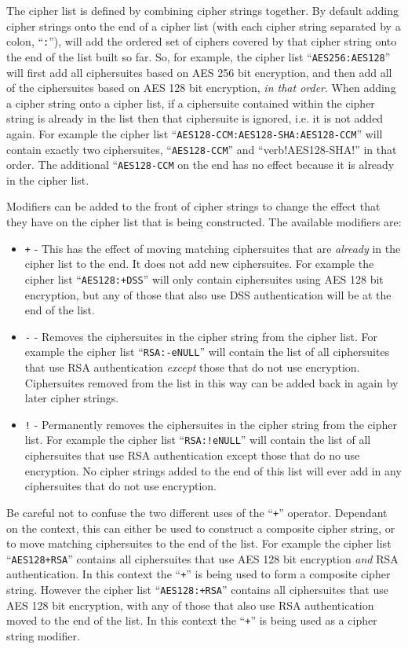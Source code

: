 The cipher list is defined by combining cipher strings together. By default 
adding cipher strings onto the end of a cipher list (with each cipher string 
separated by a colon, ``\verb!:!''), will add the ordered set of ciphers 
covered by that cipher string onto the end of the list built so far. So, for 
example, the cipher list ``\verb!AES256:AES128!'' will first add all 
ciphersuites based on AES 256 bit encryption, and then add all of the 
ciphersuites based on AES 128 bit encryption, \emph{in that order}. When adding 
a cipher string onto a cipher list, if a ciphersuite contained within the 
cipher string is already in the list then that ciphersuite is ignored, i.e. it 
is not added again. For example the cipher list 
``\verb!AES128-CCM:AES128-SHA:AES128-CCM!'' will contain exactly two
ciphersuites, ``\verb!AES128-CCM!'' and ``verb!AES128-SHA!'' in that order. The
additional ``\verb!AES128-CCM! on the end has no effect because it is already in
the cipher list.

Modifiers can be added to the front of cipher strings to change the effect that 
they have on the cipher list that is being constructed. The available modifiers 
are:
\begin{itemize}
\item \texttt{+} - This has the effect of moving matching ciphersuites that are 
\emph{already} in the cipher list to the end. It does not add new ciphersuites. 
For example the cipher list ``\texttt{AES128:+DSS}'' will only contain
ciphersuites using AES 128 bit encryption, but any of those that also use DSS
authentication will be at the end of the list.
\item \texttt{-} - Removes the ciphersuites in the cipher string from the 
cipher list. For example the cipher list ``\texttt{RSA:-eNULL}'' will contain 
the list of all ciphersuites that use RSA authentication \emph{except} those
that do not use encryption. Ciphersuites removed from the list in this way can 
be added back in again by later cipher strings.
\item \texttt{!} - Permanently removes the ciphersuites in the cipher string 
from the cipher list. For example the cipher list ``\texttt{RSA:!eNULL}'' will 
contain the list of all ciphersuites that use RSA authentication except those 
that do no use encryption. No cipher strings added to the end of this list will
ever add in any ciphersuites that do not use encryption.
\end{itemize}

Be careful not to confuse the two different uses of the ``\verb!+!'' operator. 
Dependant on the context, this can either be used to construct a composite 
cipher string, or to move matching ciphersuites to the end of the list. For 
example the cipher list ``\verb!AES128+RSA!'' contains all ciphersuites that use
AES 128 bit encryption \emph{and} RSA authentication. In this context the 
``\verb!+!'' is being used to form a composite cipher string. However the cipher
list ``\verb!AES128:+RSA!'' contains all ciphersuites that use AES 128 bit 
encryption, with any of those that also use RSA authentication moved to the end 
of the list. In this context the ``\verb!+!'' is being used as a cipher string 
modifier.

